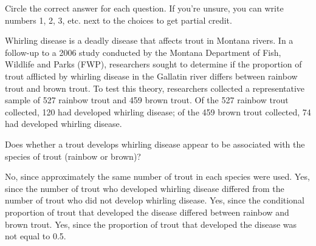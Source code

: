 \documentclass{article}
\begin{document}
	Circle the correct answer for each question.  If you're unsure, you can write numbers 1, 2, 3, etc. next to the choices to get partial credit.\\[.5cm]
	
	\begin{mcquestions}
		\begin{mcquestioninstruction}
			Whirling disease is a deadly disease that affects trout in Montana rivers. In a follow-up to a 2006 study conducted by the Montana Department of Fish, Wildlife and Parks (FWP), researchers sought to determine if the proportion of trout afflicted by whirling disease in the Gallatin river differs between rainbow trout and brown trout. To test this theory, researchers collected a representative sample of 527 rainbow trout and 459 brown trout. Of the 527 rainbow trout collected, 120 had developed whirling disease; of the 459 brown trout collected, 74 had developed whirling disease.
		\end{mcquestioninstruction}
		\question Does whether a trout develops whirling disease appear to be associated with the species of trout (rainbow or brown)?
		\begin{mcanswerslist}
			\answer No, since approximately the same number of trout in each species were used.
			\answer Yes, since the number of trout who developed whirling disease differed from the number of trout who did not develop whirling disease.
			\answer[correct] Yes, since the conditional proportion of trout that developed the disease differed between rainbow and brown trout.
			\answer Yes, since the proportion of trout that developed the disease was not equal to 0.5.
		\end{mcanswerslist}
		

\end{mcquestions}
\end{document}
